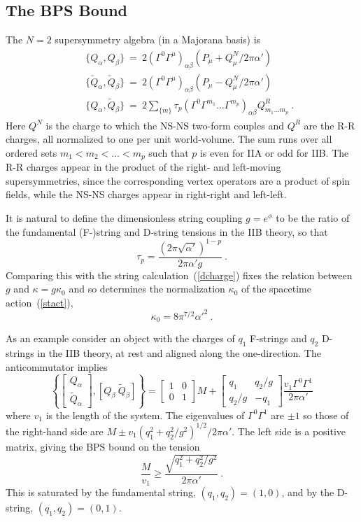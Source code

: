 \documentclass[12pt]{article}
\def\be{\begin{equation}}
\def\ee{\end{equation}}
\def\bea{\begin{eqnarray}}
\def\eea{\end{eqnarray}}
\def\ap{\alpha'}
\def\apm{\alpha'}
\begin{document}
\subsection{The BPS Bound}

The $N=2$ supersymmetry algebra (in a
Majorana basis) is
\bea
&& \{ Q_\alpha, Q_\beta \}\ 
=\ 2(\Gamma^0 \Gamma^\mu)_{\alpha\beta} ( P_\mu + Q^N_\mu/2\pi\ap )
\nonumber\\ 
&& \{ \tilde Q_\alpha, \tilde Q_\beta\}\ =\ 2(\Gamma^0
\Gamma^\mu)_{\alpha\beta} ( P_\mu - Q^N_\mu/2\pi\ap )
\nonumber\\ 
&& \{ Q_\alpha, \tilde Q_\beta \}\ =\ 2 \sum_{\{m\}} \tau_p (\Gamma^0
\Gamma^{m_1} \ldots \Gamma^{m_p})_{\alpha\beta} Q^R_{m_1\ldots m_p} \ .
\eea
Here $Q^N$ is the charge to which the NS-NS two-form couples and $Q^R$ are
the R-R charges, all normalized to one per unit world-volume.  The sum runs
over all ordered sets $m_1 < m_2 < \ldots < m_p$ such that
$p$ is even for IIA or odd for
IIB.  The R-R charges appear in the product of the right- and left-moving
supersymmetries, since the corresponding vertex operators are a product of
spin fields, while the NS-NS charges appear in right-right and left-left.

It is natural to define the dimensionless string coupling $g = e^\phi$ to be
the ratio of the fundamental (F-)string and D-string tensions in the IIB
theory, so that
\be
\tau_p = \frac{(2\pi\sqrt{\ap})^{1-p}}{2\pi\apm g}\ .
\ee
Comparing this with the string calculation~(\ref{dcharge}) fixes the relation
between $g$ and $\kappa = g \kappa_0$ and so determines the normalization
$\kappa_0$ of the spacetime action~(\ref{stact}), \cite{shanta}
\be
\kappa_0 = 8 \pi^{7/2} \ap^2\ .  \label{kap0}
\ee

As an example consider an object with the charges of $q_1$ F-strings
and $q_2$ D-strings in the IIB theory, at rest and aligned along the
one-direction.  The anticommutator implies
\be
\left\{ \left[ \begin{array}{c} Q_\alpha \\ \tilde Q_\alpha \end{array}
\right] , \left[ Q_\beta\ \tilde Q_\beta \right] \right\}
= \left[ \begin{array}{cc} 1&0 \\ 0&1 \end{array} \right] M +
\left[ \begin{array}{cc} q_1&q_2/g \\ q_2/g&-q_1 \end{array} \right]
\frac{v_1 \Gamma^0 \Gamma^1}{2\pi\apm}
\ee
where $v_1$ is the length of the system. 
The eigenvalues of $\Gamma^0 \Gamma^1$ are $\pm 1$ so those of the
right-hand side are $M \pm v_1 (q_1^2 + q_2^2/g^2)^{1/2}/2\pi\ap$.  The left
side is a positive matrix, giving the BPS bound on the tension\, \cite{schwarz}
\be
\frac{M}{v_1} \geq \frac{\sqrt{q_1^2 + q_2^2/g^2}}{2\pi\apm}\ . \label{fdbps}
\ee
This is saturated by the fundamental string, $(q_1,q_2) = (1,0)$, and by the
D-string, $(q_1,q_2) = (0,1)$. 
\end{document}
